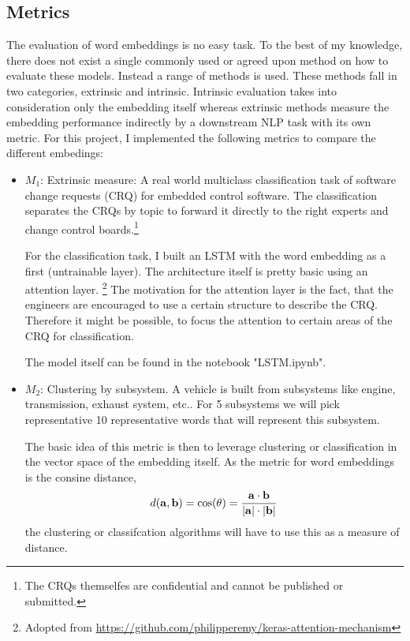 \documentclass[10pt,a4paper]{article}
\begin{document}
	\subsection{Metrics}
	\label{eval}
	The evaluation of word embeddings is no easy task. To the best of my knowledge, there does not exist a single commonly used or agreed upon method on how to evaluate these models\cite{1901.09785, Schnabel15, 1801.09536}. Instead a range of methods is used. These methods fall in two categories, extrinsic and intrinsic. Intrinsic evaluation takes into consideration only the embedding itself whereas extrinsic methods measure the embedding performance indirectly by a downstream NLP task with its own metric. For this project, I implemented the following metrics to compare the different embedings:
	
	\begin{itemize}
		\item \textbf{$M_1$}: Extrinsic measure: A real world multiclass classification task of software change requests (CRQ) for embedded control software. The classification separates the CRQs by topic to forward it directly to the right experts and change control boards.\footnote{The CRQs themselfes are confidential and cannot be published or submitted.}  
		
		For the classification task, I built an LSTM with the word embedding as a first (untrainable layer). The architecture itself is pretty basic using an attention layer. \footnote{ Adopted from \url{https://github.com/philipperemy/keras-attention-mechanism}}
		The motivation for the attention layer is the fact, that the engineers are encouraged to use a certain structure to describe the CRQ. Therefore it might be possible, to focus the attention to certain areas of the CRQ for classification. 
		
		The model itself can be found in the notebook "LSTM.ipynb".
		
		\item \textbf{$M_2$}: Clustering by subsystem. A vehicle is built from subsystems like engine, transmission, exhaust system, etc.. For 5 subsystems we will pick representative 10 representative words that will represent this subsystem. 
		
		The basic idea of this metric is then to leverage clustering or classification in the vector space of the embedding itself. As the metric for word embeddings is the consine distance, 
		\begin{equation}
		d(\bold{a}, \bold{b})=\cos(\theta)=\frac{\bold{a} \cdot \bold{b}}{|\bold{a}|\cdot|\bold{b}|}
		\end{equation}
		the clustering or classifcation algorithms will have to use this as a measure of distance.
		

\end{itemize}
\end{document}
